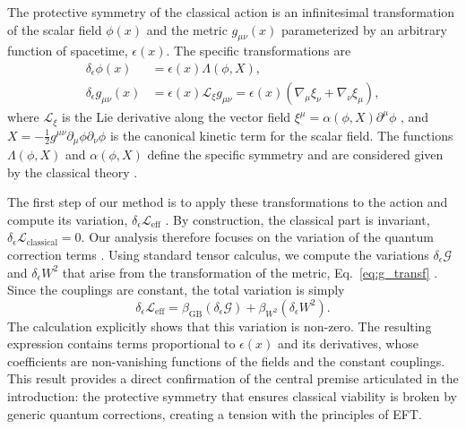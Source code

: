 \documentclass[twocolumn]{aastex631}
\begin{document}
The protective symmetry of the classical action is an infinitesimal transformation of the scalar field $\phi(x)$ and the metric $g_{\mu\nu}(x)$ parameterized by an arbitrary function of spacetime, $\epsilon(x)$. The specific transformations are
\begin{align}
\delta_\epsilon \phi(x) &= \epsilon(x) \Lambda(\phi, X), \label{eq:phi_transf} \\
\delta_\epsilon g_{\mu\nu}(x) &= \epsilon(x) \mathcal{L}_{\xi} g_{\mu\nu} = \epsilon(x) \left( \nabla_\mu \xi_\nu + \nabla_\nu \xi_\mu \right), \label{eq:g_transf}
\end{align}
where $\mathcal{L}_{\xi}$ is the Lie derivative along the vector field $\xi^\mu = \alpha(\phi, X) \partial^\mu\phi$ \citep{fabbri2025polarformdiracfields}, and $X = -\frac{1}{2}g^{\mu\nu}\partial_\mu\phi\partial_\nu\phi$ is the canonical kinetic term for the scalar field. The functions $\Lambda(\phi, X)$ and $\alpha(\phi, X)$ define the specific symmetry and are considered given by the classical theory \citep{fabbri2025polarformdiracfields}.

The first step of our method is to apply these transformations to the action and compute its variation, $\delta_\epsilon \mathcal{L}_{\text{eff}}$ \citep{wetterich2024fieldtransformationsfunctionalintegral}. By construction, the classical part is invariant, $\delta_\epsilon \mathcal{L}_{\text{classical}} = 0$. Our analysis therefore focuses on the variation of the quantum correction terms \citep{gattus2024supergeometricquantumeffectiveaction}. Using standard tensor calculus, we compute the variations $\delta_\epsilon \mathcal{G}$ and $\delta_\epsilon W^2$ that arise from the transformation of the metric, Eq.~\eqref{eq:g_transf} \citep{wetterich2024fieldtransformationsfunctionalintegral}. Since the couplings are constant, the total variation is simply
\begin{equation}
\delta_\epsilon \mathcal{L}_{\text{eff}} = \beta_{\text{GB}} (\delta_\epsilon \mathcal{G}) + \beta_{W^2} (\delta_\epsilon W^2).
\end{equation}
The calculation explicitly shows that this variation is non-zero. The resulting expression contains terms proportional to $\epsilon(x)$ and its derivatives, whose coefficients are non-vanishing functions of the fields and the constant couplings. This result provides a direct confirmation of the central premise articulated in the introduction: the protective symmetry that ensures classical viability is broken by generic quantum corrections, creating a tension with the principles of EFT.
\end{document}
